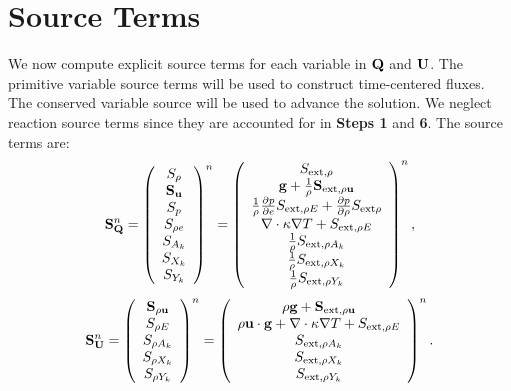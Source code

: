 \section{Source Terms}

We now compute explicit source terms for each variable in ${\bf Q}$ and
${\bf U}$.  The primitive variable source terms will be used to construct
time-centered fluxes.  The conserved variable source will be used to
advance the solution.  We neglect reaction source terms since they are
accounted for in {\bf Steps 1} and {\bf 6}.  The source terms are:
\begin{equation}
{\bf S}_{{\bf Q}}^n =
\left(\begin{array}{c}
S_\rho \\
{\bf S}_{{\bf u}} \\
S_p \\
S_{\rho e} \\
S_{A_k} \\
S_{X_k} \\
S_{Y_k}
\end{array}\right)^n
=
\left(\begin{array}{c}
S_{{\rm ext},\rho} \\
{\bf g} + \frac{1}{\rho}{\bf S}_{{\rm ext},\rho{\bf u}} \\
\frac{1}{\rho}\frac{\partial p}{\partial e}S_{{\rm ext},\rho E} + \frac{\partial p}{\partial\rho}S_{{\rm ext}\rho} \\
\nabla\cdot\kappa\nabla T + S_{{\rm ext},\rho E} \\
\frac{1}{\rho}S_{{\rm ext},\rho A_k} \\
\frac{1}{\rho}S_{{\rm ext},\rho X_k} \\
\frac{1}{\rho}S_{{\rm ext},\rho Y_k}
\end{array}\right)^n,
\end{equation}
\begin{equation}
{\bf S}_{{\bf U}}^n =
\left(\begin{array}{c}
{\bf S}_{\rho{\bf u}} \\
S_{\rho E} \\
S_{\rho A_k} \\
S_{\rho X_k} \\
S_{\rho Y_k}
\end{array}\right)^n
=
\left(\begin{array}{c}
\rho {\bf g} + {\bf S}_{{\rm ext},\rho{\bf u}} \\
\rho {\bf u} \cdot {\bf g} + \nabla\cdot\kappa\nabla T + S_{{\rm ext},\rho E} \\
S_{{\rm ext},\rho A_k} \\
S_{{\rm ext},\rho X_k} \\
S_{{\rm ext},\rho Y_k}
\end{array}\right)^n.
\end{equation}


